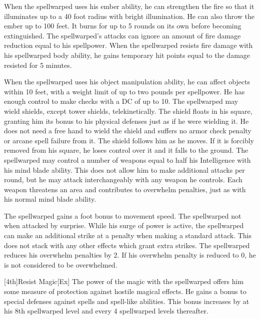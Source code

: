 When the spellwarped uses his ember ability, he can strengthen the fire so that it illuminates up to a 40 foot radius with bright illumination.
He can also throw the ember up to 100 feet.
It burns for up to 5 rounds on its own before becoming extinguished.
The spellwarped's attacks can ignore an amount of fire damage reduction equal to his spellpower.
When the spellwarped resists fire damage with his spellwarped body ability, he gains temporary hit points equal to the damage resisted for 5 minutes.

When the spellwarped uses his object manipulation ability, he can affect objects within 10 feet, with a weight limit of up to two pounds per spellpower.
He has enough control to make checks with a DC of up to 10.
The spellwarped may wield shields, except tower shields, telekinetically.
The shield floats in his square, granting him its bonus to his physical defenses just as if he were wielding it.
He does not need a free hand to wield the shield and suffers no armor check penalty or arcane spell failure from it.
The shield follows him as he moves.
If it is forcibly removed from his square, he loses control over it and it falls to the ground.
The spellwarped may control a number of weapons equal to half his Intelligence with his mind blade ability.
This does not allow him to make additional attacks per round, but he may attack interchangeably with any weapon he controls.
Each weapon threatens an area and contributes to overwhelm penalties, just as with his normal mind blade ability.

The spellwarped gains a  foot bonus to movement speed.
The spellwarped not \unaware when attacked by surprise.
While his surge of power is active, the spellwarped can make an additional strike at a  penalty when making a standard attack.
This does not stack with any other effects which grant extra strikes.
The spellwarped reduces his overwhelm penalties by 2.
If his overwhelm penalty is reduced to 0, he is not considered to be overwhelmed.

[4th]{Resist Magic}[Ex]
The power of the magic with the spellwarped offers him some measure of protection against hostile magical effects.
He gains a  bonus to special defenses against spells and spell-like abilities.
This bonus increases by  at his 8th spellwarped level and every 4 spellwarped levels thereafter.

